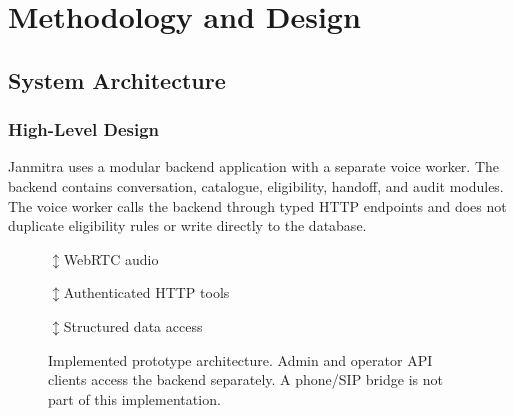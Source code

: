 \documentclass[11pt,a4paper,oneside]{report}
\begin{document}
\chapter{Methodology and Design}

\section{System Architecture}

\subsection{High-Level Design}
Janmitra uses a modular backend application with a separate voice worker. The
backend contains conversation, catalogue, eligibility, handoff, and audit modules.
The voice worker calls the backend through typed HTTP endpoints and does not
duplicate eligibility rules or write directly to the database.

\begin{figure}[htbp]
\centering
\setlength{\fboxsep}{8pt}
\par\smallskip $\updownarrow$\quad WebRTC audio\par\smallskip
{}
\par\smallskip $\updownarrow$\quad Authenticated HTTP tools\par\smallskip
{}
\par\smallskip $\updownarrow$\quad Structured data access\par\smallskip
{}
\caption{Implemented prototype architecture. Admin and operator API clients
access the backend separately. A phone/SIP bridge is not part of this implementation.}
\label{fig:architecture}
\end{figure}
\end{document}
